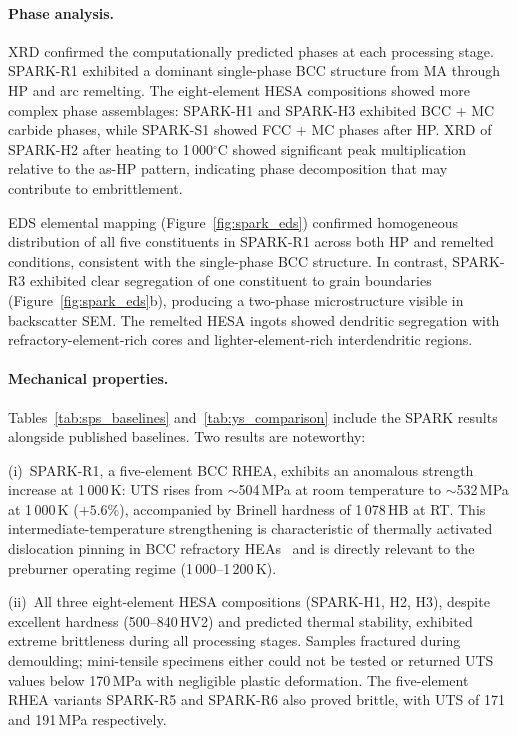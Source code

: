 \documentclass[11pt,a4paper]{article}
\begin{document}
\paragraph{Phase analysis.} XRD confirmed the computationally predicted phases at each processing stage. SPARK-R1 exhibited a dominant single-phase BCC structure from MA through HP and arc remelting. The eight-element HESA compositions showed more complex phase assemblages: SPARK-H1 and SPARK-H3 exhibited BCC + MC carbide phases, while SPARK-S1 showed FCC + MC phases after HP. XRD of SPARK-H2 after heating to 1\,000$^\circ$C showed significant peak multiplication relative to the as-HP pattern, indicating phase decomposition that may contribute to embrittlement.

EDS elemental mapping (Figure~\ref{fig:spark_eds}) confirmed homogeneous distribution of all five constituents in SPARK-R1 across both HP and remelted conditions, consistent with the single-phase BCC structure. In contrast, SPARK-R3 exhibited clear segregation of one constituent to grain boundaries (Figure~\ref{fig:spark_eds}b), producing a two-phase microstructure visible in backscatter SEM. The remelted HESA ingots showed dendritic segregation with refractory-element-rich cores and lighter-element-rich interdendritic regions.

\paragraph{Mechanical properties.} Tables~\ref{tab:sps_baselines} and~\ref{tab:ys_comparison} include the SPARK results alongside published baselines. Two results are noteworthy:

(i)~SPARK-R1, a five-element BCC RHEA, exhibits an anomalous strength increase at 1\,000\,K: UTS rises from $\sim$504\,MPa at room temperature to $\sim$532\,MPa at 1\,000\,K ($+5.6\%$), accompanied by Brinell hardness of 1\,078\,HB at RT. This intermediate-temperature strengthening is characteristic of thermally activated dislocation pinning in BCC refractory HEAs~\cite{Senkov2018} and is directly relevant to the preburner operating regime (1\,000--1\,200\,K).

(ii)~All three eight-element HESA compositions (SPARK-H1, H2, H3), despite excellent hardness (500--840\,HV2) and predicted thermal stability, exhibited extreme brittleness during all processing stages. Samples fractured during demoulding; mini-tensile specimens either could not be tested or returned UTS values below 170\,MPa with negligible plastic deformation. The five-element RHEA variants SPARK-R5 and SPARK-R6 also proved brittle, with UTS of 171 and 191\,MPa respectively.
\end{document}
